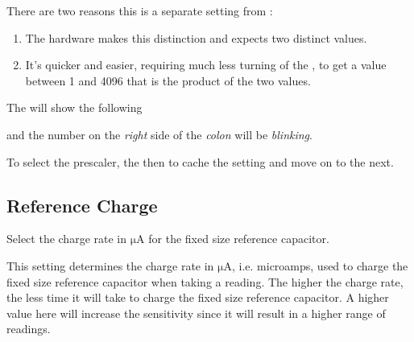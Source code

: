 \par\medskip

There are two reasons this is a separate setting from :

\begin{enumerate}
  \item The hardware makes this distinction and expects two distinct values.
  \item It's quicker and easier, requiring much less turning of the ,
    to get a value between \num{1} and \num{4096} that is the product of the
    two values.
\end{enumerate}

The  will show the following


and the number on the \textit{right} side of the \textit{colon} will be
\textit{blinking}.

\par\medskip

To select the prescaler,  the  then  to cache the setting
and move on to the next.


\subsection{Reference Charge} 

Select the charge rate in $\mathrm{\mu A}$ for the fixed size reference
capacitor.

\par\medskip

This setting determines the charge rate in $\mathrm{\mu A}$, i.e. microamps,
used to charge the fixed size reference capacitor when taking a reading.
The higher the charge rate, the less time it will take to charge the fixed size
reference capacitor.  A higher value here will increase the sensitivity since
it will result in a higher range of readings.

\par\medskip

